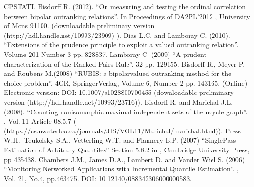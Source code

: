 \documentclass[a4paper,12pt,english]{sphinxhowto}
\begin{document}
\begin{sphinxthebibliography}{CPSTAT\sphinxhyphen{}L}
Bisdorff R. (2012). “On measuring and testing the ordinal correlation between bipolar outranking relations”. In Proceedings of DA2PL’2012 , University of Mons 91\sphinxhyphen{}100. (downloadable preliminary version  (http://hdl.handle.net/10993/23909) ).
Dias L.C. and Lamboray C. (2010). “Extensions of the prudence principle to exploit a valued outranking relation”.  Volume 201 Number 3 pp. 828\sphinxhyphen{}837.
Lamboray C. (2009) “A prudent characterization of the Ranked Pairs Rule”.  32 pp. 129\sphinxhyphen{}155.
Bisdorff R., Meyer P. and Roubens M.(2008) “RUBIS: a bipolar\sphinxhyphen{}valued outranking method for the choice problem”. 4OR,  Springer\sphinxhyphen{}Verlag, Volume 6,  Number 2 pp. 143\sphinxhyphen{}165. (Online) Electronic version: DOI: 10.1007/s10288\sphinxhyphen{}007\sphinxhyphen{}0045\sphinxhyphen{}5 (downloadable preliminary version  (http://hdl.handle.net/10993/23716)).
Bisdorff R. and Marichal J.\sphinxhyphen{}L. (2008). “Counting non\sphinxhyphen{}isomorphic maximal independent sets of the n\sphinxhyphen{}cycle graph”. , Vol. 11 Article 08.5.7 ( (https://cs.uwaterloo.ca/journals/JIS/VOL11/Marichal/marichal.html)).
Press W.H., Teukolsky S.A., Vetterling W.T. and Flannery B.P. (2007) “Single\sphinxhyphen{}Pass Estimation of Arbitrary Quantiles” Section 5.8.2 in , Cambridge University Press, pp 435\sphinxhyphen{}438.
Chambers J.M., James D.A., Lambert D. and Vander Wiel S. (2006) “Monitoring Networked Applications with Incremental Quantile Estimation”. , Vol. 21, No.4, pp.463\sphinxhyphen{}475. DOI: 10 12140/088342306000000583.

\end{sphinxthebibliography}
\end{document}
